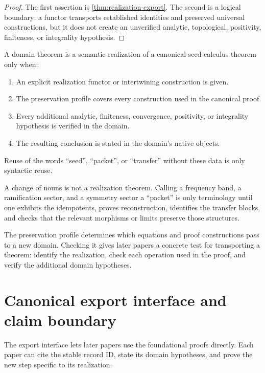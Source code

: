 \begin{proof}
The first assertion is \cref{thm:realization-export}.  The second is a logical boundary: a functor transports established identities and preserved universal constructions, but it does not create an unverified analytic, topological, positivity, finiteness, or integrality hypothesis.
\end{proof}

\begin{definition}
\label{def:semantic-realization}
A domain theorem is a semantic realization of a canonical seed calculus theorem only when:
\begin{enumerate}[label=(\roman*)]
\item An explicit realization functor or intertwining construction is given.
\item The preservation profile covers every construction used in the canonical proof.
\item Every additional analytic, finiteness, convergence, positivity, or integrality hypothesis is verified in the domain.
\item The resulting conclusion is stated in the domain's native objects.
\end{enumerate}
Reuse of the words ``seed'', ``packet'', or ``transfer'' without these data is only syntactic reuse.
\end{definition}

\begin{warningbox}
A change of nouns is not a realization theorem.  Calling a frequency band, a ramification sector, and a symmetry sector a ``packet'' is only terminology until one exhibits the idempotents, proves reconstruction, identifies the transfer blocks, and checks that the relevant morphisms or limits preserve those structures.
\end{warningbox}

\begin{sectionrecap}
The preservation profile determines which equations and proof constructions pass to a new domain.  Checking it gives later papers a concrete test for transporting a theorem: identify the realization, check each operation used in the proof, and verify the additional domain hypotheses.
\end{sectionrecap}


\section{Canonical export interface and claim boundary}
\begin{readerroadmap}
The export interface lets later papers use the foundational proofs directly.  Each paper can cite the stable record ID, state its domain hypotheses, and prove the new step specific to its realization.
\end{readerroadmap}

